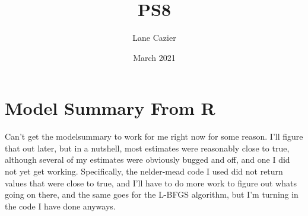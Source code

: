 \documentclass{article}
\title{PS8}
\author{Lane Cazier}
\date{March 2021}
\begin{document}
\maketitle

\section{Model Summary From R}
Can't get the modelsummary to work for me right now for some reason. I'll figure that out later, but in a nutshell, most estimates were reasonably close to true, although several of my estimates were obviously bugged and off, and one I did not yet get working. Specifically, the nelder-mead code I used did not return values that were close to true, and I'll have to do more work to figure out whats going on there, and the same goes for the L-BFGS algorithm, but I'm turning in the code I have done anyways. 
\end{document}
